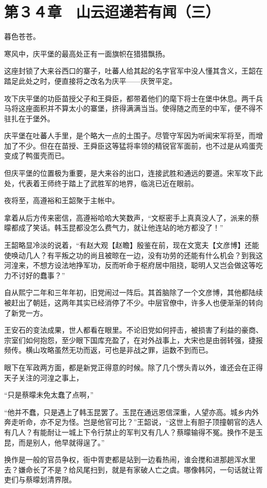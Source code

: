 \section{第３４章　山云迢递若有闻（三）}

暮色苍苍。

寒风中，庆平堡的最高处正有一面旗帜在猎猎飘扬。

这座封锁了大来谷西口的寨子，吐蕃人给其起的名字官军中没人懂其含义，王韶在踏足此处之时，便直接将之改名为庆平——庆贺平定。

攻下庆平堡的功臣苗授父子和王舜臣，都带着他们的麾下将士在堡中休息。两千兵马将这座面积并不算太小的寨堡，挤得满满当当。使得随之而至的中军，便不得不驻扎在于堡外。

庆平堡在吐蕃人手里，是个略大一点的土围子。尽管守军因为听闻宋军将至，而增加了不少。但在在苗授、王舜臣这等猛将率领的精锐官军面前，也不过是从鸡蛋壳变成了鸭蛋壳而已。

但庆平堡的位置极为重要，是大来谷的出口，连接武胜和通远的要道。宋军攻下此处，代表着王师终于踏上了武胜军的地界，临洮已近在眼前。

夜将至，高遵裕和王韶聚于主帐中。

拿着从后方传来密信，高遵裕哈哈大笑数声，“文枢密手上真真没人了，派来的蔡曚都成了笑话。韩玉昆都没怎么费气力，就让他连站的地方都没了！”

王韶略显冷淡的说着，“有赵大观【赵瞻】殷鉴在前，现在文宽夫【文彦博】还能使唤动几人？有平叛之功的尚且被晾在一边，没有功劳的还能有什么机会？到我这河湟来，不想方设法地挣军功，反而听命于枢府居中阻挠，聪明人又岂会做这等吃力不讨好的蠢事？”

自从熙宁二年和三年年初，旧党闹过一阵后。其首脑除了一个文彦博，其他都陆续被赶出了朝廷，这两年其实已经消停了不少。中层官僚中，许多人也便渐渐的转向了新党一方。

王安石的变法成果，世人都看在眼里。不论旧党如何抨击，被损害了利益的豪商、宗室们如何抱怨，至少眼下国库充盈了，在对外战事上，大宋也是由弱转强，捷报频传。横山攻略虽然无功而返，可也是非战之罪，运数不到而已。

眼下在军政两方面，都是新党正得意的时候。除了几个愣头青以外，谁还会在正得天子关注的河湟之事上，

“只是蔡曚未免太蠢了点啊，”

“他并不蠢，只是遇上了韩玉昆罢了。玉昆在通远恩信深重，人望亦高。城乡内外奔走听命，亦不足为怪。岂是他官可比？”王韶说，“这世上有胆子顶撞朝官的选人有几人？有能耐让一城上下令行禁止的军判又有几人？蔡曚输得不冤。换作不是玉昆，而是别人，他早就得逞了。”

换作是一般的官员争权，衙中胥吏都是站到一边看热闹，谁会搅和进那趟浑水里去？嫌命长了不是？给风尾扫到，就是有家破人亡之虞。哪像韩冈，一句话就让胥吏们与蔡曚划清界限。

